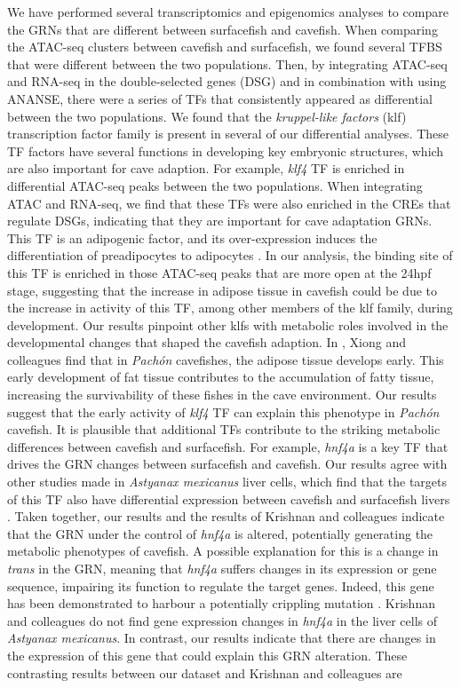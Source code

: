 We have performed several transcriptomics and epigenomics analyses to compare the GRNs that are different between surfacefish and cavefish. When comparing the ATAC-seq clusters between cavefish and surfacefish, we found several TFBS that were different between the two populations. Then, by integrating ATAC-seq and RNA-seq in the double-selected genes (DSG) and in combination with using ANANSE, there were a series of TFs that consistently appeared as differential between the two populations. We found that the \textit{kruppel-like factors} (klf) transcription factor family is present in several of our differential analyses. These TF factors have several functions in developing key embryonic structures, which are also important for cave adaption. For example, \textit{klf4} TF is enriched in differential ATAC-seq peaks between the two populations. When integrating ATAC and RNA-seq, we find that these TFs were also enriched in the CREs that regulate DSGs, indicating that they are important for cave adaptation GRNs. This TF is an adipogenic factor, and its over-expression induces the differentiation of preadipocytes to adipocytes \parencite{li_kruppel-like_2022}. In our analysis, the binding site of this TF is enriched in those ATAC-seq peaks that are more open at the 24hpf stage, suggesting that the increase in adipose tissue in cavefish could be due to the increase in activity of this TF, among other members of the klf family, during development. Our results pinpoint other klfs with metabolic roles involved in the developmental changes that shaped the cavefish adaption. In \parencite{xiong_early_2018}, Xiong and colleagues find that in \textit{Pachón} cavefishes, the adipose tissue develops early. This early development of fat tissue contributes to the accumulation of fatty tissue, increasing the survivability of these fishes in the cave environment. Our results suggest that the early activity of \textit{klf4} TF can explain this phenotype in \textit{Pachón} cavefish. It is plausible that additional TFs contribute to the striking metabolic differences between cavefish and surfacefish. For example, \textit{hnf4a} is a key TF that drives the GRN changes between surfacefish and cavefish. Our results agree with other studies made in \textit{Astyanax mexicanus} liver cells, which find that the targets of this TF also have differential expression between cavefish and surfacefish livers \parencite{krishnan_genome-wide_2022}. Taken together, our results and the results of Krishnan and colleagues indicate that  the GRN under the control of \textit{hnf4a} is altered, potentially generating the metabolic phenotypes of cavefish. A possible explanation for this is a change in \textit{trans} in the GRN, meaning that \textit{hnf4a} suffers changes in its expression or gene sequence, impairing its function to regulate the target genes. Indeed, this gene has been demonstrated to harbour a potentially crippling mutation \parencite{warren_chromosome-level_2021}. Krishnan and colleagues do not find gene expression changes in \textit{hnf4a} in the liver cells of \textit{Astyanax mexicanus}. In contrast, our results indicate that there are changes in the expression of this gene that could explain this GRN alteration. These contrasting results between our dataset and Krishnan and colleagues are 